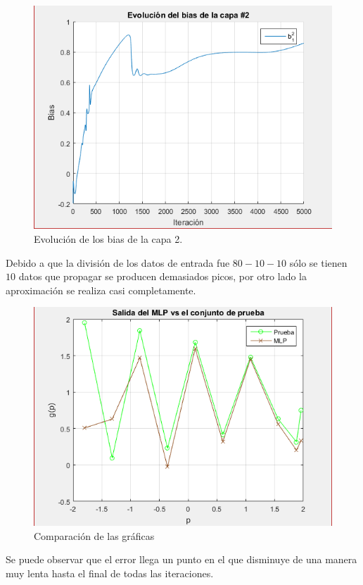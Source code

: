 \documentclass[12pt, titlepage]{article}
\begin{document}
\begin{figure}[H]
    \begin{center}
        \includegraphics[width=12cm]{1/bias2.png}
        \caption{Evolución de los bias de la capa 2.}
        \label{fig:bias2}
    \end{center}
\end{figure}
Debido a que la división de los datos de entrada fue $80-10-10$ sólo se tienen $10$ datos que propagar se producen demasiados picos, por otro lado la aproximación se realiza casi completamente.
\begin{figure}[H]
    \begin{center}
        \includegraphics[width=12cm]{1/prueba.png}
        \caption{Comparación de las gráficas}
        \label{fig:prueba1}
    \end{center}
\end{figure}
Se puede observar que el error llega un punto en el que disminuye de una manera muy lenta hasta el final de todas las iteraciones.
\end{document}
